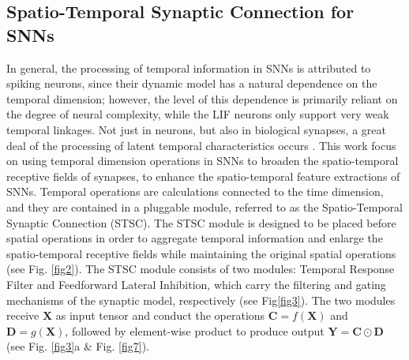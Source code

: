 \documentclass[letterpaper]{article} \usepackage[submission]{aaai23}  \usepackage{times}  \usepackage{helvet}  \usepackage{courier}  \usepackage[hyphens]{url}  \usepackage{graphicx} \urlstyle{rm} \def\UrlFont{\rm}  \usepackage{natbib}  \usepackage{caption} \frenchspacing  \setlength{\pdfpagewidth}{8.5in} \setlength{\pdfpageheight}{11in} \usepackage{algorithm}
\begin{document}
\subsection{Spatio-Temporal Synaptic Connection for SNNs}
In general, the processing of temporal information in SNNs is attributed to spiking neurons, since their dynamic model has a natural dependence on the temporal dimension; however, the level of this dependence is primarily reliant on the degree of neural complexity, while the LIF neurons only support very weak temporal linkages.
Not just in neurons, but also in biological synapses, a great deal of the processing of latent temporal characteristics occurs \cite{luo_architectures_nodate,letellier_differential_2019}.
This work focus on using temporal dimension operations in SNNs to broaden the spatio-temporal receptive fields of synapses, to enhance the spatio-temporal feature extractions of SNNs.
Temporal operations are calculations connected to the time dimension, and they are contained in a pluggable module, referred to as the Spatio-Temporal Synaptic Connection (STSC). The STSC module is designed to be placed before spatial operations in order to aggregate  temporal information and enlarge the spatio-temporal receptive fields while maintaining the original spatial operations (see Fig. \ref{fig2}).
The STSC module consists of two modules: Temporal Response Filter and Feedforward Lateral Inhibition, which carry the filtering and gating mechanisms of the synaptic model, respectively (see Fig\ref{fig3}). The two modules receive $\mathbf{X}$ as input tensor and conduct the operations $\mathbf{C}=f(\mathbf{X})$ and $\mathbf{D}=g(\mathbf{X})$, followed by element-wise product to produce output $\mathbf{Y}=\mathbf{C}\odot \mathbf{D}$ (see Fig. \ref{fig3}a \& Fig. \ref{fig7}).
\end{document}

